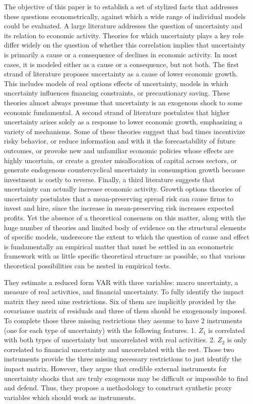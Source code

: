 \documentclass{article}
\begin{document}
{The objective of this paper is to establish a set of stylized facts that addresses these questions econometrically, against which a wide range of individual models could be evaluated. A large literature addresses the question of uncertainty and its relation to economic activity. Theories for which uncertainty plays a key role differ widely on the question of whether this correlation implies that uncertainty is primarily a cause or a consequence of declines in economic activity. In most cases, it is modeled either as a cause or a consequence, but not both. The first strand of literature proposes uncertainty as a cause of lower economic growth. This includes models of real options effects of uncertainty, models in which uncertainty influences financing constraints, or precautionary saving. These theories almost always presume that uncertainty is an exogenous shock to some economic fundamental. A second strand of literature postulates that higher uncertainty arises solely as a response to lower economic growth, emphasizing a variety of mechanisms. Some of these theories suggest that bad times incentivize risky behavior, or reduce information and with it the forecastability of future outcomes, or provoke new and unfamiliar economic policies whose effects are highly uncertain, or create a greater misallocation of capital across sectors, or generate endogenous countercyclical uncertainty in consumption growth because investment is costly to reverse. Finally, a third literature suggests that uncertainty can actually increase economic activity. Growth options theories of uncertainty postulates that a mean-preserving spread risk can cause firms to invest and hire, since the increase in mean-preserving risk increases expected profits. Yet the absence of a theoretical consensus on this matter, along with the huge number of theories and limited body of evidence on the structural elements of specific models, underscore the extent to which the question of cause and effect is fundamentally an empirical matter that must be settled in an econometric framework with as little specific theoretical structure as possible, so that various theoretical possibilities can be nested in empirical tests. 

They estimate a reduced form VAR with three variables: macro uncertainty, a measure of real activities, and financial uncertainty. To fully identify the impact matrix they need nine restrictions. Six of them are implicitly provided by the covariance matrix of residuals and three of them should be exogenously imposed. To complete those three missing restrictions they assume to have 2 instruments (one for each type of uncertainty) with the following features. 1. $Z_1$ is correlated with both types of uncertainty but uncorrelated with real activities. 2. $Z_2$ is only correlated to financial uncertainty and uncorrelated with the rest. Those two instruments provide the three missing necessary restrictions to just identify the impact matrix. However, they argue that credible external instruments for uncertainty shocks that are truly exogenous may be difficult or impossible to find and defend. Thus, they propose a methodology to construct synthetic proxy variables which should work as instruments.


}
\end{document}
